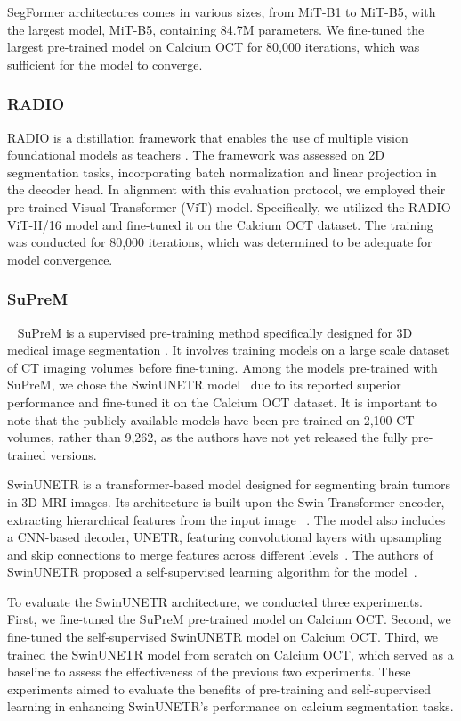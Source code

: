 \documentclass[a4paper,11pt,oneside]{report}
\begin{document}
SegFormer architectures comes in various sizes, from MiT-B1 to MiT-B5, with the largest model, MiT-B5, containing 84.7M parameters. We fine-tuned the largest pre-trained model on Calcium OCT for 80,000 iterations, which was sufficient for the model to converge.

\subsubsection{RADIO}
RADIO is a distillation framework that enables the use of multiple vision foundational models as teachers \cite{Ranzinger2024RADIO}. The framework was assessed on 2D segmentation tasks, incorporating batch normalization and linear projection in the decoder head. In alignment with this evaluation protocol, we employed their pre-trained Visual Transformer (ViT) model. Specifically, we utilized the RADIO ViT-H/16 model and fine-tuned it on the Calcium OCT dataset. The training was conducted for 80,000 iterations, which was determined to be adequate for model convergence.

\subsubsection{SuPreM}~\label{sec:design:suprem}
SuPreM is a supervised pre-training method specifically designed for 3D medical image segmentation \cite{Li2024}. It involves training models on a large scale dataset of CT imaging volumes before fine-tuning. Among the models pre-trained with SuPreM, we chose the SwinUNETR model~\cite{Tang2022} due to its reported superior performance and fine-tuned it on the Calcium OCT dataset. It is important to note that the publicly available models have been pre-trained on 2,100 CT volumes, rather than 9,262, as the authors have not yet released the fully pre-trained versions.

SwinUNETR is a transformer-based model designed for segmenting brain tumors in 3D MRI images. Its architecture is built upon the Swin Transformer encoder, extracting hierarchical features from the input image ~\cite{Liu2021Swin}. The model also includes a CNN-based decoder, UNETR, featuring convolutional layers with upsampling and skip connections to merge features across different levels~\cite{Hatamizadeh2022}. The authors of SwinUNETR proposed a self-supervised learning algorithm for the model~\cite{Tang2022}. 

To evaluate the SwinUNETR architecture, we conducted three experiments. First, we fine-tuned the SuPreM pre-trained model on Calcium OCT. Second, we fine-tuned the self-supervised SwinUNETR model on Calcium OCT. Third, we trained the SwinUNETR model from scratch on Calcium OCT, which served as a baseline to assess the effectiveness of the previous two experiments. These experiments aimed to evaluate the benefits of pre-training and self-supervised learning in enhancing SwinUNETR's performance on calcium segmentation tasks.
\end{document}
